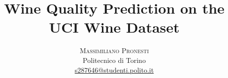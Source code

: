 \documentclass[twoside]{article}
\title{\vspace{-15mm}\fontsize{24pt}{10pt}\selectfont\textbf{Wine Quality Prediction on the UCI Wine Dataset}} %
\author{
	\large
	\textsc{Massimiliano Pronesti}\\[2mm] %
	\normalsize Politecnico di Torino \\ %
	\normalsize \href{mailto:s287646@studenti.polito.it}{s287646@studenti.polito.it} %
	\vspace{-5mm}
}
\date{}
\begin{document}
	
	\maketitle %
	

	\begin{multicols}{2} %
		
		
		
		

	\end{multicols}
	
\end{document}
